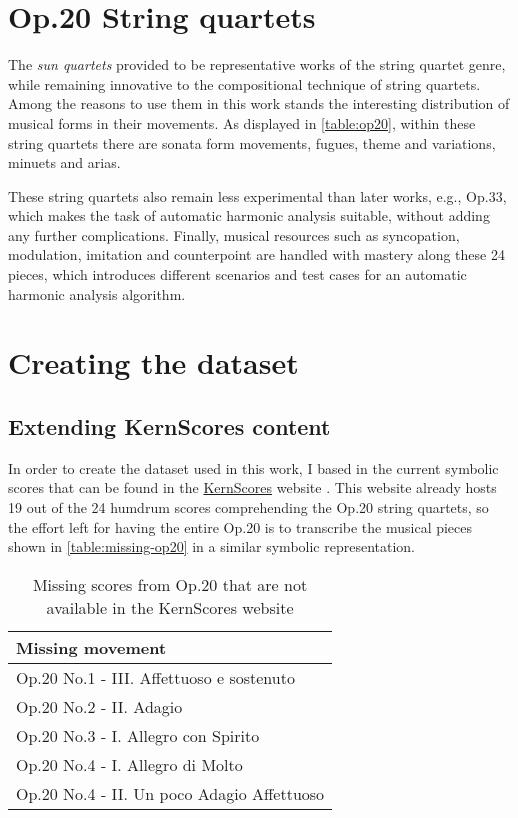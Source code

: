 \section{Op.20 String quartets}
The \emph{sun quartets} provided to be representative works of the string quartet genre, while remaining innovative to the compositional technique of string quartets. Among the reasons to use them in this work stands the interesting distribution of musical forms in their movements. As displayed in \autoref{table:op20}, within these string quartets there are sonata form movements, fugues, theme and variations, minuets and arias.

These string quartets also remain less experimental than later works, e.g., Op.33, which makes the task of automatic harmonic analysis suitable, without adding any further complications. Finally, musical resources such as syncopation, modulation, imitation and counterpoint are handled with mastery along these 24 pieces, which introduces different scenarios and test cases for an automatic harmonic analysis algorithm.

\section{Creating the dataset}
\subsection{Extending KernScores content}
In order to create the dataset used in this work, I based in the current symbolic scores that can be found in the \href{http://kern.ccarh.org/}{KernScores} website \cite{kernscores}. This website already hosts 19 out of the 24 humdrum scores comprehending the Op.20 string quartets, so the effort left for having the entire Op.20 is to transcribe the musical pieces shown in \autoref{table:missing-op20} in a similar symbolic representation.

\begin{table}[tbp]
\centering
\begin{tabular}{|l|}
\hline
Missing movement \\ \hline
Op.20 No.1 - III. Affettuoso e sostenuto \\ \hline
Op.20 No.2 - II. Adagio \\ \hline
Op.20 No.3 - I. Allegro con Spirito \\ \hline
Op.20 No.4 - I. Allegro di Molto \\ \hline
Op.20 No.4 - II. Un poco Adagio Affettuoso \\ \hline
\end{tabular}
\caption{Missing scores from Op.20 that are not available in the KernScores website}
\label{table:missing-op20}
\end{table}

